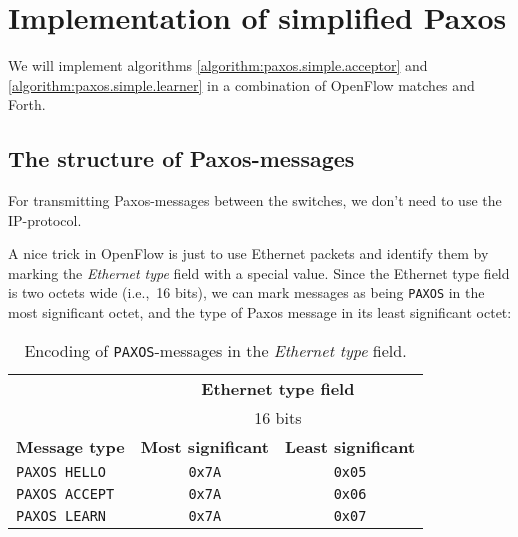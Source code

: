 \chapter{Implementation of simplified Paxos}
\label{implementation.simplified.paxos}

We will implement algorithms \ref{algorithm:paxos.simple.acceptor} 
and \ref{algorithm:paxos.simple.learner} in a combination of OpenFlow
matches and Forth.



\section{The structure of Paxos-messages}

For transmitting Paxos-messages between the switches, we don't need to use
the IP-protocol.

A nice trick in OpenFlow is just to use Ethernet packets
and identify them by marking the \textit{Ethernet type} field with a special value.
Since the Ethernet type field is two octets wide (i.e.,~16 bits), we can
mark messages as being \texttt{PAXOS} in the most significant octet, and the
type of Paxos message in its least significant octet:

\begin{table}[H]
  \centering
  \begin{tabular}{l|c|c|}
    \cline{2-3}
      & \multicolumn{2}{c|}{\textbf{Ethernet type field}} \\
      & \multicolumn{2}{c|}{16 bits} \\

    \hline
      \multicolumn{1}{|l|}{\textbf{Message type}} &
      \textbf{Most significant} &
      \textbf{Least significant} \\

    \hline
      \multicolumn{1}{|l|}{\texttt{PAXOS HELLO}} &
      \texttt{0x7A} &
      \texttt{0x05} \\

    \hline
      \multicolumn{1}{|l|}{\texttt{PAXOS ACCEPT}} &
      \texttt{0x7A} &
      \texttt{0x06} \\

    \hline
      \multicolumn{1}{|l|}{\texttt{PAXOS LEARN}} &
      \texttt{0x7A} &
      \texttt{0x07} \\

    \hline
  \end{tabular}
  \caption{Encoding of \texttt{PAXOS}-messages in the \textit{Ethernet
    type} field.}
  \label{table:paxos.ethernet.type.encoding}
\end{table}

